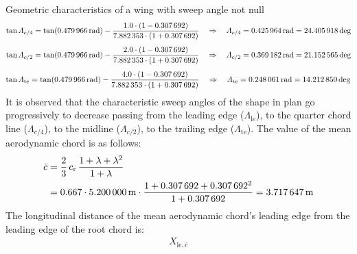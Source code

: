 \documentclass[[12pt,twoside]{book}
\begin{document}
\begin{myExampleX}{Geometric characteristics of a wing with sweep angle not null}{}
\[
\tan
\Lambda_{c/4}
   = \tan (\SI[round-precision=3]{\myLambdaLERad}{\radian})
      - \dfrac{
         \num[round-precision=2]{1.0}
         \cdot (1-\SI[round-precision=2]{\myTaperRatioWing}{})
      }{
         \num[round-precision=2]{\myAspectRatioWing}
         \cdot (1+\SI[round-precision=2]{\myTaperRatioWing}{})} 
   \quad
   \Rightarrow
   \quad
   \Lambda_{c/4}
      =\SI[round-precision=3]{\myLambdaCQuarterRad}{\radian} 
      =\SI[round-precision=1]{\myLambdaCQuarterDeg}{\deg}
\]
%
\[
\tan
\Lambda_{c/2}
   = \tan (\SI[round-precision=3]{\myLambdaLERad}{\radian})
      - \dfrac{
         \num[round-precision=2]{2.0}
         \cdot (1-\SI[round-precision=2]{\myTaperRatioWing}{})
      }{
         \num[round-precision=2]{\myAspectRatioWing}
         \cdot (1+\SI[round-precision=2]{\myTaperRatioWing}{})} 
   \quad
   \Rightarrow
   \quad
   \Lambda_{c/2}
      =\SI[round-precision=3]{\myLambdaCHalfRad}{\radian} 
      =\SI[round-precision=1]{\myLambdaCHalfDeg}{\deg} 
\]
%
\[
\tan
\Lambda_\mathrm{te}
   = \tan (\SI[round-precision=3]{\myLambdaLERad}{\radian})
      - \dfrac{
         \num[round-precision=2]{4.0}
         \cdot (1-\SI[round-precision=2]{\myTaperRatioWing}{})
      }{
         \num[round-precision=2]{\myAspectRatioWing}
         \cdot (1+\SI[round-precision=2]{\myTaperRatioWing}{})} 
   \quad
   \Rightarrow
   \quad
   \Lambda_\mathrm{te}
      =\SI[round-precision=3]{\myLambdaTERad}{\radian}
      =\SI[round-precision=1]{\myLambdaTEDeg}{\deg} 
\]
It is observed that the characteristic sweep angles of the shape in plan go progressively to decrease passing from the leading edge ($\Lambda_\mathrm{le}$), 
to the quarter chord line ($\Lambda_{c/4}$),
to the midline ($\Lambda_{c/2}$),
to the trailing edge ($\Lambda_\mathrm{te}$).
The value of the mean aerodynamic chord is as follows:
\[
\begin{split}
\bar{c} & {}= \frac{2}{3} \, c_\mathrm{r} \, \frac{1+\lambda + \lambda^2}{1+\lambda} \\
  & {}=
    \num{0.667} \cdot \SI[round-precision=2]{\myChordRootWingMT}{\metre}
      \cdot 
        \frac{
          1 + \SI[round-precision=2]{\myTaperRatioWing}{} + \SI[round-precision=2]{\myTaperRatioWing}{}^2
        }{
          1 + \SI[round-precision=2]{\myTaperRatioWing}{}
        }
    = \SI[round-precision=2]{\myMACWingMT}{\metre} 
\end{split}
\]
The longitudinal distance of the mean aerodynamic chord's leading edge from the leading edge of the root chord is:
\[
\begin{split}
X_{\mathrm{le},\bar{c}} 

\end{split}\]
\end{myExampleX}
\end{document}
